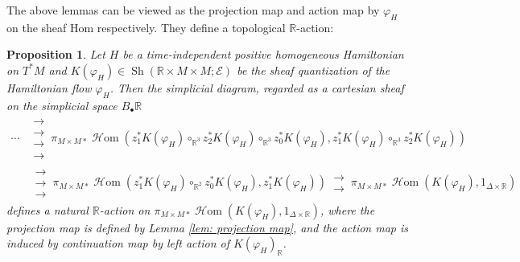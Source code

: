 \documentclass[11pt]{amsart}
\numberwithin{equation}{section}
\theoremstyle{plain}
\newtheorem{Prop}[prop]{Proposition}
\theoremstyle{definition}
\theoremstyle{remark}
\newcommand{\bR} { {\mathbb{R}}}
\newcommand{\cE} { {\mathcal{E}}}
\newcommand{\Sh} { {\operatorname{Sh}}}
\newcommand\sHom{\operatorname{\mathscr{H}om}}
\begin{document}
The above lemmas can be viewed as the projection map and action map by $\varphi_H$ on the sheaf Hom respectively. They define a topological $\bR$-action:

\begin{Prop}\label{prop: R action}
Let $H$ be a time-independent positive homogeneous Hamiltonian on $T^*M$ and $K(\varphi_H) \in \Sh(\bR \times M \times M; \cE)$ be the sheaf quantization of the Hamiltonian flow $\varphi_H$. Then the simplicial diagram, regarded as a cartesian sheaf on the simplicial space $B_\bullet\bR$
\begin{align*}
\cdots & \substack{\longrightarrow \\[-0.8em] \longrightarrow \\[-0.8em] \longrightarrow \\[-0.8em] \longrightarrow}\, \pi_{M\times M*}\sHom(z_1^*K(\varphi_H) \circ_{\bR^3} z_2^*K(\varphi_H) \circ_{\bR^3} z_0^*K(\varphi_H), z_1^*K(\varphi_H) \circ_{\bR^3} z_2^*K(\varphi_H)) \\
&\,\substack{\longrightarrow \\[-0.8em] \longrightarrow \\[-0.8em] \longrightarrow}\, \pi_{M\times M*}\sHom(z_1^*K(\varphi_H) \circ_{\bR^2} z_0^*K(\varphi_H), z_1^*K(\varphi_H)) \,\substack{\longrightarrow \\[-0.8em] \longrightarrow}\, \pi_{M\times M*}\sHom(K(\varphi_H), 1_{\Delta\times\bR})
\end{align*}
defines a natural $\bR$-action on $\pi_{M\times M*}\sHom(K(\varphi_H), 1_{\Delta\times\bR})$, where the projection map is defined by Lemma \ref{lem: projection map}, and the action map is induced by continuation map by left action of $K(\varphi_H)_\bR$.
\end{Prop}
\end{document}
